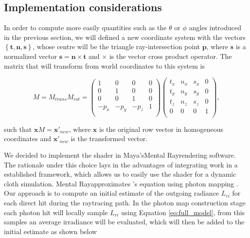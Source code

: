 \documentclass[12pt]{article}
\begin{document}
\subsection{Implementation considerations}

In order to compute more easily quantities such as the $\theta$ or $\phi$ angles introduced in the previous section, we will defined a new coordinate system with the vectors $\left\lbrace \mathbf{t},\mathbf{n},\mathbf{s} \right\rbrace$, whose centre will be the triangle ray-intersection point $\mathbf{p}$, where $\mathbf{s}$ is a normalized vector $\mathbf{s} = \mathbf{n} \times \mathbf{t}$ and $\times$ is the vector cross product operator.
The matrix that will transform from world coordinates to this system is

\begin{equation}
M = M_{trans}M_{rot} =
\begin{pmatrix}
1 & 0 & 0 & 0 \\
0 & 1 & 0 & 0 \\
0 & 0 & 1 & 0 \\
-p_x & -p_y & -p_z & 1 \\
\end{pmatrix}
\begin{pmatrix}
t_x & n_x & s_x & 0 \\
t_y & n_y & s_y & 0 \\
t_z & n_z & s_z & 0 \\
0 & 0 & 0 & 1 \\
\end{pmatrix},
\end{equation}

such that $\mathbf{x}M=\mathbf{x}'_{new}$, where $\mathbf{x}$ is the original row vector in homogeneous coordinates and $\mathbf{x}'_{new}$ is the transformed vector.

We decided to implement the shader in Maya's\texttrademark Mental Ray\texttrademark rendering software.
The rationale under this choice lays in the advantages of integrating work in a established framework, which allows us to easily use the shader for a dynamic cloth simulation.
Mental Ray\texttrademark approximates \citeauthor{Kajiya1986}'s equation \cite{Kajiya1986} using photon mapping \cite{Jensen1996}.
Our approach is to compute an initial estimate of the outgoing radiance $L_{ri}$ for each direct hit during the raytracing path.
In the photon map construction stage each photon hit will locally sample $L_{ri}$ using Equation \ref{eq:full_model}, from this samples an average irradiance will be evaluated, which will then be added to the initial estimate as shown below
\end{document}

